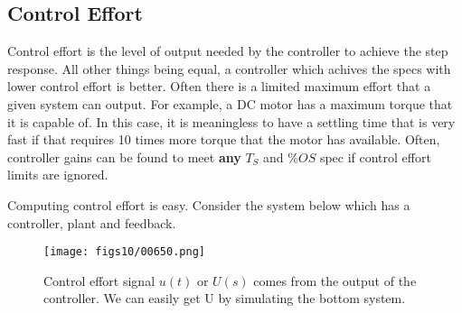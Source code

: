 
\subsection{Control Effort}\label{CtlEff}


Control effort is the level of output needed by the controller to achieve the step response.  All other things being equal, a controller which achives the specs with lower control effort is better.  Often there is a limited maximum effort that a given system can output.  For example, a DC motor has a maximum torque that it is capable of. In this case, it is meaningless to have a settling time that is very fast if that requires 10 times more torque that the motor has available.  Often, controller gains can be found to meet {\bf any} $T_S$ and $\%OS$ spec if control effort limits are ignored.	%


Computing control effort is easy.  Consider the system below which has a controller, plant and feedback.	%

 




\begin{figure}\centering
\texttt{[image: figs10/00650.png]}
\caption{Control effort signal $u(t)$ or $U(s)$ comes from the output of the controller. We can easily get U by simulating the bottom system.}\label{controleffort}
\end{figure}







